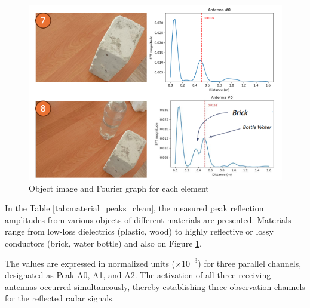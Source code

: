 \begin{figure}[H]
    \centering
    \includegraphics[width=0.6\linewidth]{Src//images/E1S23.png}
    \caption{Object image and Fourier graph for each element}
    \label{fig:Objectvisl2}
\end{figure}

In the Table \ref{tab:material_peaks_clean}, the measured peak reflection amplitudes from various objects of different materials are presented. Materials range from low-loss dielectrics (plastic, wood) to highly reflective or lossy conductors (brick, water bottle) and also on Figure \ref{fig:Objectvisl2}. 


The values are expressed in normalized units ($\times 10^{-3}$) for three parallel channels, designated as Peak A0, A1, and A2. The activation of all three receiving antennas occurred simultaneously, thereby establishing three observation channels for the reflected radar signals.

